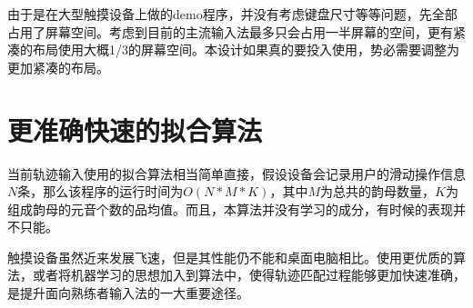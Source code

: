 由于是在大型触摸设备上做的demo程序，并没有考虑键盘尺寸等等问题，先全部占用了屏幕空间。考虑到目前的主流输入法最多只会占用一半屏幕的空间，更有紧凑的布局使用大概1/3的屏幕空间。本设计如果真的要投入使用，势必需要调整为更加紧凑的布局。

\section{更准确快速的拟合算法}

当前轨迹输入使用的拟合算法相当简单直接，假设设备会记录用户的滑动操作信息\(N\)条，那么该程序的运行时间为\(O(N * M * K)\)，其中\(M\)为总共的韵母数量，\(K\)为组成韵母的元音个数的品均值。而且，本算法并没有学习的成分，有时候的表现并不只能。

触摸设备虽然近来发展飞速，但是其性能仍不能和桌面电脑相比。使用更优质的算法，或者将机器学习的思想加入到算法中，使得轨迹匹配过程能够更加快速准确，是提升面向熟练者输入法的一大重要途径。
